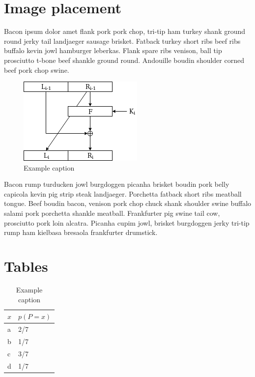 \documentclass[12pt]{article}
\begin{document}
\begin{titlepage}
	\maketitle
    \thispagestyle{empty}
\end{titlepage}

\section{Image placement}\label{sec:image-placement}
Bacon ipsum dolor amet flank pork pork chop, tri-tip ham turkey shank ground round jerky tail landjaeger sausage brisket. Fatback turkey short ribs beef ribs buffalo kevin jowl hamburger leberkas. Flank spare ribs venison, ball tip prosciutto t-bone beef shankle ground round. Andouille boudin shoulder corned beef pork chop swine.

\begin{figure}[h] %
    \centering
    \includegraphics[scale=0.75]{example.png} %
    \caption{Example caption}
    \label{fig:example}
\end{figure}

Bacon rump turducken jowl burgdoggen picanha brisket boudin pork belly capicola kevin pig strip steak landjaeger. Porchetta fatback short ribs meatball tongue. Beef boudin bacon, venison pork chop chuck shank shoulder swine buffalo salami pork porchetta shankle meatball. Frankfurter pig swine tail cow, prosciutto pork loin alcatra. Picanha cupim jowl, brisket burgdoggen jerky tri-tip rump ham kielbasa bresaola frankfurter drumstick.

\section{Tables}
\begin{table}[h] %
\centering %
\begin{tabular}{@{}ll@{}}
\toprule
\textbf{$x$} & \textbf{$p(P=x)$} \\ \midrule
a            & 2/7               \\
b            & 1/7               \\
c            & 3/7               \\
d            & 1/7               \\ \bottomrule
\end{tabular}
\caption{Example caption} %
\label{tab:example} %
\end{table}
\end{document}
